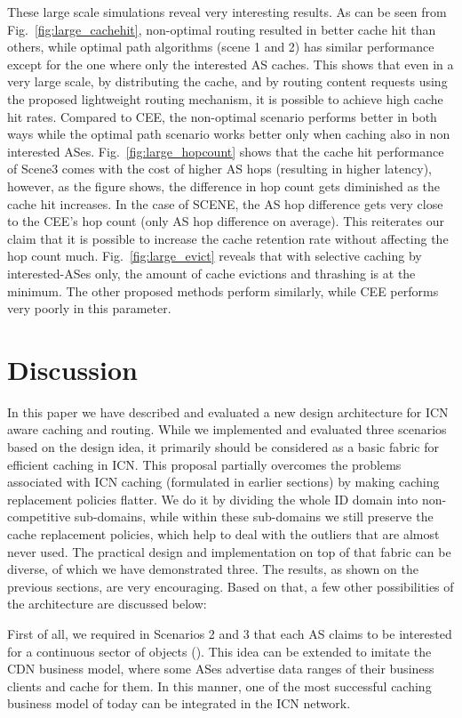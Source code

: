 \documentclass[article]{elsarticle}
\begin{document}
These large scale simulations reveal very interesting results. As can be seen from Fig.~\ref{fig:large_cachehit}, non-optimal routing resulted in better cache hit than others, while optimal path algorithms (scene 1 and 2) has similar performance except for the one where only the interested AS caches. This shows that even in a very large scale, by distributing the cache, and by routing content requests using the proposed lightweight routing mechanism, it is possible to achieve high cache hit rates. Compared to CEE, the non-optimal scenario performs better in both ways while the optimal path scenario works better only when caching also in non interested ASes. Fig.~\ref{fig:large_hopcount} shows that the cache hit performance of Scene3 comes with the cost of higher AS hops (resulting in higher latency), however, as the figure shows, the difference in hop count gets diminished as the cache hit increases. In the case of SCENE, the AS hop difference gets very close to the CEE's hop count (only  AS hop difference on average). This reiterates our claim that it is possible to increase the cache retention rate without affecting the hop count much. Fig.~\ref{fig:large_evict} reveals that with selective caching by interested-ASes only, the amount of cache evictions and thrashing is at the minimum. The other proposed methods perform similarly, while CEE performs very poorly in this parameter. 

\section{Discussion}
\label{sec:disc}
In this paper we have described and evaluated a new design architecture for ICN aware caching and routing. While we implemented  and evaluated three scenarios based on the design idea, it primarily should be considered as a basic fabric for efficient caching in ICN. This proposal partially overcomes the problems associated with ICN caching (formulated in earlier sections) by making caching replacement policies flatter. We do it by dividing the whole ID domain into non-competitive sub-domains, while within these sub-domains we still preserve the cache replacement policies, which help to deal with the outliers that are almost never used. The practical design and implementation on top of that fabric can be diverse, of which we have demonstrated three. The results, as shown on the previous sections, are very encouraging. Based on that, a few other possibilities of the architecture are discussed below:

First of all, we required in Scenarios 2 and 3 that each AS claims to be interested for a continuous sector of objects (). This idea can be extended to imitate the CDN business model, where some ASes advertise data ranges of their business clients and cache for them. In this manner, one of the most successful caching business model of today can be integrated in the ICN network.
\end{document}
